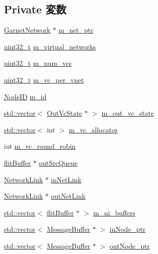 \subsection*{Private 変数}
\begin{DoxyCompactItemize}
\item 
\hyperlink{classGarnetNetwork}{GarnetNetwork} $\ast$ \hyperlink{classNetworkInterface_a6f69c0ff922be798fa1cfce69f83244e}{m\_\-net\_\-ptr}
\item 
\hyperlink{Type_8hh_a435d1572bf3f880d55459d9805097f62}{uint32\_\-t} \hyperlink{classNetworkInterface_a3c1d97c5d987e52985843dcb76edc7fb}{m\_\-virtual\_\-networks}
\item 
\hyperlink{Type_8hh_a435d1572bf3f880d55459d9805097f62}{uint32\_\-t} \hyperlink{classNetworkInterface_a42c554e0c38c6d9572a889f296afcd38}{m\_\-num\_\-vcs}
\item 
\hyperlink{Type_8hh_a435d1572bf3f880d55459d9805097f62}{uint32\_\-t} \hyperlink{classNetworkInterface_a5391ff1054ec6311f1c449e769c14f83}{m\_\-vc\_\-per\_\-vnet}
\item 
\hyperlink{TypeDefines_8hh_a83c14b4ae37e80071f6b3506a6c46151}{NodeID} \hyperlink{classNetworkInterface_aaed4e1d0badfbd8b21e43869898ed184}{m\_\-id}
\item 
\hyperlink{classstd_1_1vector}{std::vector}$<$ \hyperlink{classOutVcState}{OutVcState} $\ast$ $>$ \hyperlink{classNetworkInterface_adeb08e3a1efa0be9efa58648b1edfb5c}{m\_\-out\_\-vc\_\-state}
\item 
\hyperlink{classstd_1_1vector}{std::vector}$<$ int $>$ \hyperlink{classNetworkInterface_a4e31a4f4aad8462157e797cdb1e3e00c}{m\_\-vc\_\-allocator}
\item 
int \hyperlink{classNetworkInterface_a4e50d04fbae98d5e7eac566ab56f4227}{m\_\-vc\_\-round\_\-robin}
\item 
\hyperlink{classflitBuffer}{flitBuffer} $\ast$ \hyperlink{classNetworkInterface_a7c2f0247427488afa8f925d46c82195e}{outSrcQueue}
\item 
\hyperlink{classNetworkLink}{NetworkLink} $\ast$ \hyperlink{classNetworkInterface_a7ce7214ee8901e3eebaf74366e556c20}{inNetLink}
\item 
\hyperlink{classNetworkLink}{NetworkLink} $\ast$ \hyperlink{classNetworkInterface_a6175110fc176a7aeb64b1ea1df878c6f}{outNetLink}
\item 
\hyperlink{classstd_1_1vector}{std::vector}$<$ \hyperlink{classflitBuffer}{flitBuffer} $\ast$ $>$ \hyperlink{classNetworkInterface_a278caf0cf6647c7e2bc1cb787662ea4e}{m\_\-ni\_\-buffers}
\item 
\hyperlink{classstd_1_1vector}{std::vector}$<$ \hyperlink{classMessageBuffer}{MessageBuffer} $\ast$ $>$ \hyperlink{classNetworkInterface_a933eda70266204185e6bc2a65f0add98}{inNode\_\-ptr}
\item 
\hyperlink{classstd_1_1vector}{std::vector}$<$ \hyperlink{classMessageBuffer}{MessageBuffer} $\ast$ $>$ \hyperlink{classNetworkInterface_aff22e632df88a83fbcbac281efec0dcc}{outNode\_\-ptr}
\end{DoxyCompactItemize}


